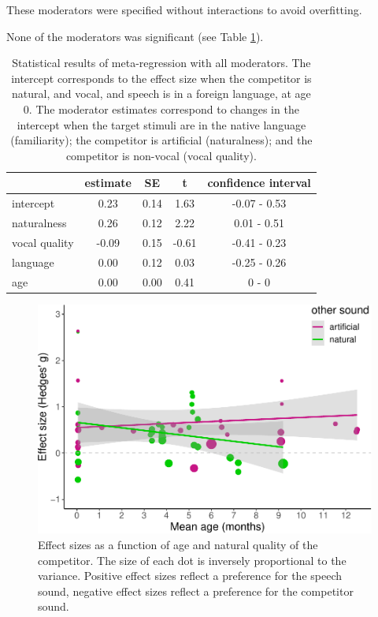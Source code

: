 \documentclass[
  english,
  man]{apa6}
\begin{document}
These moderators were specified without interactions to avoid overfitting.

None of the moderators was significant (see Table \ref{tab:Table2}).

\begin{table}[tbp]

\begin{center}
\begin{threeparttable}

\caption{\label{tab:Table2}Statistical results of meta-regression with all moderators. The intercept corresponds to the effect size when the competitor is natural, and vocal, and speech is in a foreign language, at age 0. The moderator estimates correspond to changes in the intercept when the target stimuli are in the native language (familiarity); the competitor is artificial (naturalness); and the competitor is non-vocal (vocal quality).}

\begin{tabular}{lcccc}
\toprule
 & estimate & SE & t & confidence interval\\
\midrule
intercept & 0.23 & 0.14 & 1.63 & -0.07 - 0.53\\
naturalness & 0.26 & 0.12 & 2.22 & 0.01 - 0.51\\
vocal quality & -0.09 & 0.15 & -0.61 & -0.41 - 0.23\\
language & 0.00 & 0.12 & 0.03 & -0.25 - 0.26\\
age & 0.00 & 0.00 & 0.41 & 0 - 0\\
\bottomrule
\end{tabular}

\end{threeparttable}
\end{center}

\end{table}

\begin{figure}
\centering
\includegraphics{MA_speech_pref_files/figure-latex/natural-1.pdf}
\caption{\label{fig:natural}Effect sizes as a function of age and natural quality of the competitor. The size of each dot is inversely proportional to the variance. Positive effect sizes reflect a preference for the speech sound, negative effect sizes reflect a preference for the competitor sound.}
\end{figure}
\end{document}
